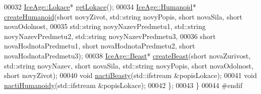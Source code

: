\begin{DoxyCode}
00032         \hyperlink{classIceAge_1_1Lokace}{IceAge::Lokace}* \hyperlink{classIceAge_1_1BuilderLokace_ada96fb10689d0b6f2ed2f7cdc31a171e}{getLokace}(); 
00034         \hyperlink{classIceAge_1_1Humanoid}{IceAge::Humanoid}* \hyperlink{classIceAge_1_1BuilderLokace_abff6ab9c1d0218adfe423f45c8186090}{createHumanoid}(\textcolor{keywordtype}{short} novyZivot, std::string 
      novyPopis, \textcolor{keywordtype}{short} novaSila, \textcolor{keywordtype}{short} novaOdolnost,
00035                                       std::string novyNazevPredmetu1, std::string novyNazevPredmetu2, 
      std::string novyNazevPredmetu3,
00036                                       \textcolor{keywordtype}{short} novaHodnotaPredmetu1, \textcolor{keywordtype}{short} novaHodnotaPredmetu2, \textcolor{keywordtype}{short} 
      novaHodnotaPredmetu3);
00038         \hyperlink{classIceAge_1_1Beast}{IceAge::Beast}* \hyperlink{classIceAge_1_1BuilderLokace_a6ce9f158876a0601a3bac0cc26ed2d46}{createBeast}(\textcolor{keywordtype}{short} novaZurivost, std::string novyNazev, \textcolor{keywordtype}{short}
       novaSila, std::string novyPopis, \textcolor{keywordtype}{short} novaOdolnost, \textcolor{keywordtype}{short} novyZivot);
00040         \textcolor{keywordtype}{void} \hyperlink{classIceAge_1_1BuilderLokace_a8424c61902a53f9304460055f478601b}{nactiBeasty}(std::ifstream &popisLokace); 
00041         \textcolor{keywordtype}{void} \hyperlink{classIceAge_1_1BuilderLokace_a98fae825f3de1d12408a85f03d98f2fd}{nactiHumanoidy}(std::ifstream &popisLokace);
00042     \};
00043 \}
00044 \textcolor{preprocessor}{#endif}
\end{DoxyCode}
